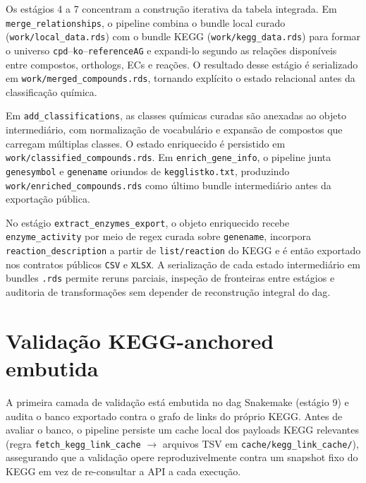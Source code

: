 Os estágios 4 a 7 concentram a construção iterativa da tabela integrada. Em \texttt{merge\_relationships}, o pipeline combina o bundle local curado (\texttt{work/local\_data.rds}) com o bundle KEGG (\texttt{work/kegg\_data.rds}) para formar o universo \texttt{cpd}--\texttt{ko}--\texttt{referenceAG} e expandi-lo segundo as relações disponíveis entre compostos, orthologs, ECs e reações. O resultado desse estágio é serializado em \texttt{work/merged\_compounds.rds}, tornando explícito o estado relacional antes da classificação química.

Em \texttt{add\_classifications}, as classes químicas curadas são anexadas ao objeto intermediário, com normalização de vocabulário e expansão de compostos que carregam múltiplas classes. O estado enriquecido é persistido em \texttt{work/classified\_compounds.rds}. Em \texttt{enrich\_gene\_info}, o pipeline junta \texttt{genesymbol} e \texttt{genename} oriundos de \texttt{kegglistko.txt}, produzindo \texttt{work/enriched\_compounds.rds} como último bundle intermediário antes da exportação pública.

No estágio \texttt{extract\_enzymes\_export}, o objeto enriquecido recebe \texttt{enzyme\_activity} por meio de regex curada sobre \texttt{genename}, incorpora \texttt{reaction\_description} a partir de \texttt{list/reaction} do KEGG e é então exportado nos contratos públicos \texttt{CSV} e \texttt{XLSX}. A serialização de cada estado intermediário em bundles \texttt{.rds} permite reruns parciais, inspeção de fronteiras entre estágios e auditoria de transformações sem depender de reconstrução integral do \gls{dag}.

\section{Validação KEGG-anchored embutida}
\label{sec:c1-validacao-kegg}

A primeira camada de validação está embutida no \gls{dag} Snakemake (estágio 9) e audita o banco exportado contra o grafo de links do próprio KEGG. Antes de avaliar o banco, o pipeline persiste um cache local dos payloads KEGG relevantes (regra \texttt{fetch\_kegg\_link\_cache} $\rightarrow$ arquivos TSV em \texttt{cache/kegg\_link\_cache/}), assegurando que a validação opere reproduzivelmente contra um snapshot fixo do KEGG em vez de re-consultar a API a cada execução.

